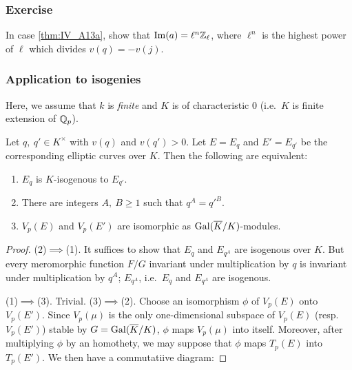 \begin{subappendices}
\subsubsection*{Exercise}
In case \ref{thm:IV_A13a}, show that $\operatorname{Im}(a) = \ell^n \mathbb{Z}_\ell$, where $\ell^n$
is the highest power of $\ell$ which divides $v(q) = -v(j)$.

\subsubsection{Application to isogenies}
\label{sec:IV_A14}

Here, we assume that $k$ is \emph{finite} and $K$ is of characteristic $0$
(i.e.\ $K$ is finite extension of $\mathbb{Q}_p$).

\begin{thm}
Let $q,~q' \in K^\times$ with $v(q)$ and $v(q') > 0$. Let $E = E_q$ and $E' =
E_{q'}$ be the corresponding elliptic curves over $K$. Then the following are
equivalent:
\begin{enumerate}[(1)]
	\item $E_q$ is $K$-isogenous to $E_{q'}$.
	\item There are integers $A,~B \geq 1$ such that $q^A = q'^B$.
	\item $V_p(E)$ and $V_p(E')$ are isomorphic as
$\operatorname{Gal}(\overline{K}/K)$-modules.
\end{enumerate}
\end{thm}

\begin{proof}
(2)$\implies$(1). It suffices to show that $E_q$ and $E_{q^A}$ are isogenous
over $K$. But every meromorphic function $F / G$ invariant under multiplication
by $q$ is invariant under multiplication by $q^A$; $E_{q^A}$, i.e.\, $E_q$ and
$E_{q^A}$ are isogenous.

(1)$\implies$(3). Trivial.
\dpage
(3)$\implies$(2). Choose an isomorphism $\phi$ of $V_p(E)$ onto $V_p(E')$. Since
$V_p(\mu)$ is the only one-dimensional subspace of $V_p(E)$ (resp. $V_p(E')$)
stable by $G = \operatorname{Gal}(\overline{K}/K)$, $\phi$ maps $V_p(\mu)$ into itself. Moreover,
after multiplying $\phi$ by an homothety,  we may suppose that $\phi$ maps
$T_p(E)$ into $T_p(E')$. We then have a commutatiive diagram:


\end{proof}
\end{subappendices}
